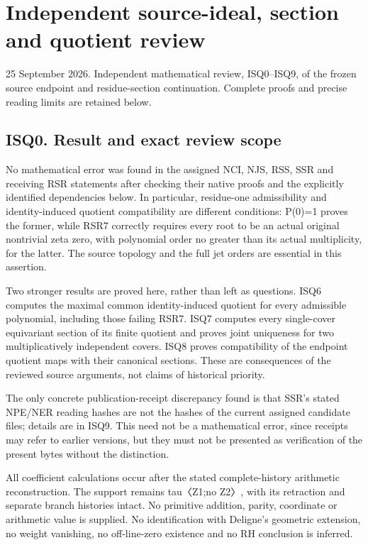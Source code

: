 \documentclass[
]{article}
\author{}
\date{}
\begin{document}
\section{Independent source-ideal, section and quotient review}\label{independent-source-ideal-section-and-quotient-review}

25 September 2026. Independent mathematical review, ISQ0--ISQ9, of the frozen source endpoint and residue-section continuation. Complete proofs and precise reading limits are retained below.

\subsection{ISQ0. Result and exact review scope}\label{isq0.-result-and-exact-review-scope}

No mathematical error was found in the assigned NCI, NJS, RSS, SSR and receiving RSR statements after checking their native proofs and the explicitly identified dependencies below. In particular, residue-one admissibility and identity-induced quotient compatibility are different conditions: P(0)=1 proves the former, while RSR7 correctly requires every root to be an actual original nontrivial zeta zero, with polynomial order no greater than its actual multiplicity, for the latter. The source topology and the full jet orders are essential in this assertion.

Two stronger results are proved here, rather than left as questions. ISQ6 computes the maximal common identity-induced quotient for every admissible polynomial, including those failing RSR7. ISQ7 computes every single-cover equivariant section of its finite quotient and proves joint uniqueness for two multiplicatively independent covers. ISQ8 proves compatibility of the endpoint quotient maps with their canonical sections. These are consequences of the reviewed source arguments, not claims of historical priority.

The only concrete publication-receipt discrepancy found is that SSR's stated NPE/NER reading hashes are not the hashes of the current assigned candidate files; details are in ISQ9. This need not be a mathematical error, since receipts may refer to earlier versions, but they must not be presented as verification of the present bytes without the distinction.

All coefficient calculations occur after the stated complete-history arithmetic reconstruction. The support remains tau〈Z1;no Z2〉, with its retraction and separate branch histories intact. No primitive addition, parity, coordinate or arithmetic value is supplied. No identification with Deligne's geometric extension, no weight vanishing, no off-line-zero existence and no RH conclusion is inferred.
\end{document}
